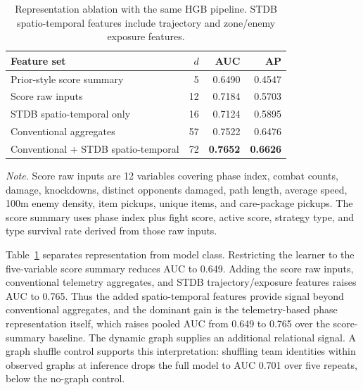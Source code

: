 \begin{table}[htbp]
\centering
\caption{Representation ablation with the same HGB pipeline. STDB
spatio-temporal features include trajectory and zone/enemy exposure features.}
\label{tab:repr}
\small
\begin{tabular}{lrrr}
\toprule
Feature set & \(d\) & AUC & AP \\
\midrule
Prior-style score summary & 5 & 0.6490 & 0.4547 \\
Score raw inputs & 12 & 0.7184 & 0.5703 \\
STDB spatio-temporal only & 16 & 0.7124 & 0.5895 \\
Conventional aggregates & 57 & 0.7522 & 0.6476 \\
Conventional + STDB spatio-temporal & 72 & \textbf{0.7652} & \textbf{0.6626} \\
\bottomrule
\end{tabular}
\vspace{2pt}
\begin{minipage}{0.96\linewidth}
\scriptsize
\textit{Note.} Score raw inputs are 12 variables covering phase index, combat
counts, damage, knockdowns, distinct opponents damaged, path length, average
speed, 100m enemy density, item pickups, unique items, and care-package
pickups. The score summary uses phase index plus fight score, active score,
strategy type, and type survival rate derived from those raw inputs.
\end{minipage}
\end{table}

Table~\ref{tab:repr} separates representation from model class. Restricting
the learner to the five-variable score summary reduces AUC to 0.649. Adding
the score raw inputs, conventional telemetry aggregates, and STDB trajectory/exposure
features raises AUC to 0.765. Thus the added spatio-temporal features provide
signal beyond conventional aggregates, and the dominant gain is the
telemetry-based phase representation itself, which raises pooled AUC from
0.649 to 0.765 over the score-summary baseline. The dynamic graph supplies an additional relational signal. A graph
shuffle control supports this interpretation: shuffling team identities within
observed graphs at inference drops the full model to AUC 0.701 over five
repeats, below the no-graph control.
